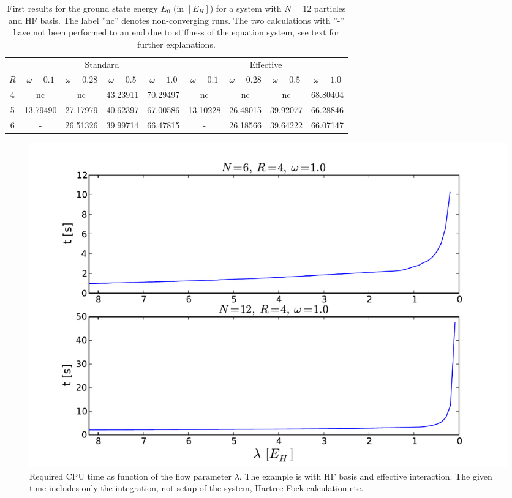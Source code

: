 \begin{table}
\begin{center}
\tabcolsep=0.19cm
\begin{tabular}{|c|cccc|cccc|}
\hline\hline
& \multicolumn{4}{c}{Standard} & \multicolumn{4}{c|}{Effective} \\
$R$  & $\omega = 0.1$ & $\omega = 0.28$ & $\omega=0.5$ & $\omega=1.0$ & $\omega = 0.1$ & $\omega = 0.28$ & $\omega=0.5$ & $\omega=1.0$\\
\hline
4 & nc&nc &43.23911 &70.29497 &nc &nc &nc &68.80404 \\
5 &13.79490 &27.17979 &40.62397 &67.00586 &13.10228 &26.48015 &39.92077 & 66.28846\\
6 & -&26.51326 &39.99714 &66.47815 &- & 26.18566& 39.64222& 66.07147\\
\hline\hline
\end{tabular}
\end{center}
\caption{First results for the ground state energy $E_0$ (in $\left[E_H\right]$) for a system with $N=12$ particles and HF basis. The label ''nc'' denotes non-converging runs. The two calculations with ''-'' have not been performed  to an end due to stiffness of the equation system, see text for further explanations.}
\label{tab:12part0wegner}
\end{table}

\begin{figure}
\begin{center}
\includegraphics[scale=0.45]{../Plots/timeIMlambda.pdf}
\end{center}
\caption{Required CPU time as function of the flow parameter $\lambda$. The example is with HF basis and effective interaction. The given time includes only the integration, not setup of the system, Hartree-Fock calculation etc.}
\label{fig:timeIMlambda}
\end{figure}


